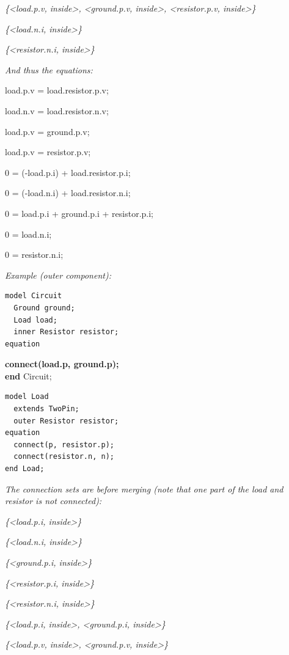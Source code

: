 \documentclass[10pt,a4paper]{report}
\begin{document}
\emph{\{\textless{}load.p.v, inside\textgreater{},
\textless{}ground.p.v, inside\textgreater{}, \textless{}resistor.p.v,
inside\textgreater{}\}}

\emph{\{\textless{}load.n.i, inside\textgreater{}\}}

\emph{\{\textless{}resistor.n.i, inside\textgreater{}\}}

\emph{And thus the equations:}

load.p.v = load.resistor.p.v;

load.n.v = load.resistor.n.v;

load.p.v = ground.p.v;

load.p.v = resistor.p.v;

0 = (-load.p.i) + load.resistor.p.i;

0 = (-load.n.i) + load.resistor.n.i;

0 = load.p.i + ground.p.i + resistor.p.i;

0 = load.n.i;

0 = resistor.n.i;

\emph{Example (outer component):}

\begin{lstlisting}[language=modelica]
model Circuit
  Ground ground;
  Load load;
  inner Resistor resistor;
equation
\end{lstlisting}
\textbf{connect(load.p, ground.p);\\
end} Circuit;

\begin{lstlisting}[language=modelica]
model Load
  extends TwoPin;
  outer Resistor resistor;
equation
  connect(p, resistor.p);
  connect(resistor.n, n);
end Load;
\end{lstlisting}
\emph{The connection sets are before merging (note that one part of the
load and resistor is not connected):}

\emph{\{\textless{}load.p.i, inside\textgreater{}\}}

\emph{\{\textless{}load.n.i, inside\textgreater{}\}}

\emph{\{\textless{}ground.p.i, inside\textgreater{}\}}

\emph{\{\textless{}resistor.p.i, inside\textgreater{}\}}

\emph{\{\textless{}resistor.n.i, inside\textgreater{}\}}

\emph{\{\textless{}load.p.i, inside\textgreater{},
\textless{}ground.p.i, inside\textgreater{}\}}

\emph{\{\textless{}load.p.v, inside\textgreater{},
\textless{}ground.p.v, inside\textgreater{}\}}
\end{document}
